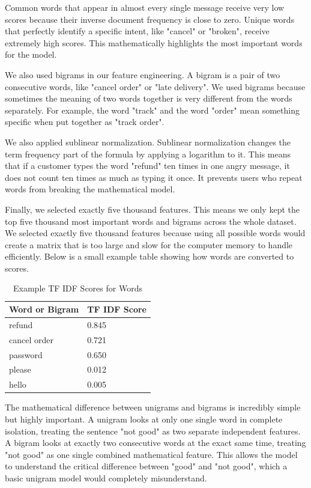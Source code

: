 \documentclass[12pt]{article}
\begin{document}
Common words that appear in almost every single message receive very low scores because their inverse document frequency is close to zero. Unique words that perfectly identify a specific intent, like "cancel" or "broken", receive extremely high scores. This mathematically highlights the most important words for the model. 

We also used bigrams in our feature engineering. A bigram is a pair of two consecutive words, like "cancel order" or "late delivery". We used bigrams because sometimes the meaning of two words together is very different from the words separately. For example, the word "track" and the word "order" mean something specific when put together as "track order". 

We also applied sublinear normalization. Sublinear normalization changes the term frequency part of the formula by applying a logarithm to it. This means that if a customer types the word "refund" ten times in one angry message, it does not count ten times as much as typing it once. It prevents users who repeat words from breaking the mathematical model. 

Finally, we selected exactly five thousand features. This means we only kept the top five thousand most important words and bigrams across the whole dataset. We selected exactly five thousand features because using all possible words would create a matrix that is too large and slow for the computer memory to handle efficiently. Below is a small example table showing how words are converted to scores.

\begin{table}[H]
\centering
\caption{Example TF IDF Scores for Words}
\begin{tabular}{|l|l|}
\hline
\textbf{Word or Bigram} & \textbf{TF IDF Score} \\ \hline
refund & 0.845 \\ \hline
cancel order & 0.721 \\ \hline
password & 0.650 \\ \hline
please & 0.012 \\ \hline
hello & 0.005 \\ \hline
\end{tabular}
\end{table}


The mathematical difference between unigrams and bigrams is incredibly simple but highly important. A unigram looks at only one single word in complete isolation, treating the sentence "not good" as two separate independent features. A bigram looks at exactly two consecutive words at the exact same time, treating "not good" as one single combined mathematical feature. This allows the model to understand the critical difference between "good" and "not good", which a basic unigram model would completely misunderstand.
\end{document}
